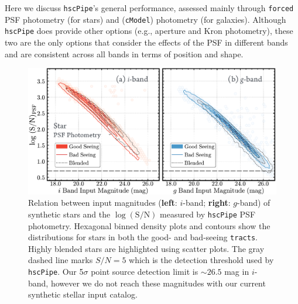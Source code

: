 \documentclass[useamsfonts]{pasj01}
\def\hscpipe{\texttt{hscPipe}}
\def\cmodel{\texttt{cModel}}
\def\forced{\texttt{forced}}
\def\tracts{\texttt{tracts}}
\begin{document}
    Here we discuss \hscpipe{}'s general performance, assessed mainly through \forced{} 
    PSF photometry (for stars) and (\cmodel{}) photometry (for galaxies).
    Although \hscpipe{} does provide other options (e.g., aperture and Kron photometry),
    these two are the only options that consider the effects of the PSF in different 
    bands and are consistent across all bands in terms of position and shape. 
    

\begin{figure}
    \begin{center}
        \includegraphics[width=\textwidth]{fig/synpipe_psf_sn}
    \end{center}
    \caption{
        Relation between input magnitudes (\textbf{left}: $i$-band; \textbf{right}:
        $g$-band) of synthetic stars and the $\log (\mathrm{S}/\mathrm{N})$ measured 
        by \hscpipe{} PSF photometry.
        Hexagonal binned density plots and contours show the distributions for
        stars in both the good- and bad-seeing \tracts{}. 
        Highly blended stars are highlighted using scatter plots.
        The gray dashed line marks $S/N = 5$ which is the detection threshold used 
        by \hscpipe{}.  
        Our 5$\sigma$ point source detection limit is ${\sim}26.5$ mag in $i$-band,
        however we do not reach these magnitudes with our current synthetic stellar 
        input catalog.
        }
    \label{fig:star_sn}
\end{figure}
\end{document}
